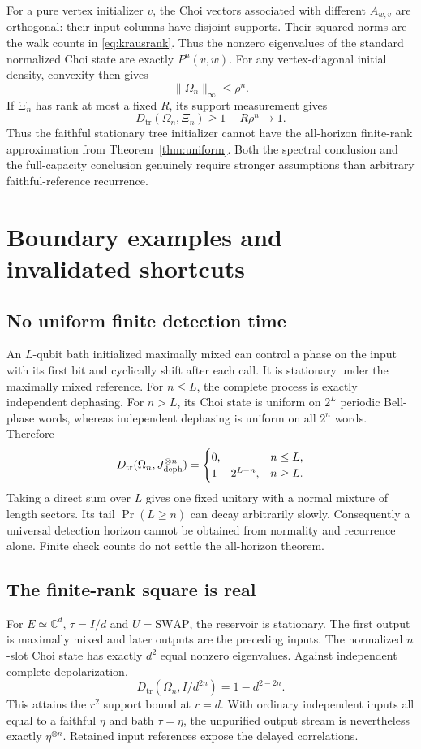 \documentclass[11pt]{article}
\theoremstyle{definition}\newtheorem{definition}[theorem]{Definition}
\newcommand{\norm}[1]{\lVert #1\rVert}
\newcommand{\D}{D_{\mathrm{tr}}}
\begin{document}
For a pure vertex initializer $v$, the Choi vectors associated with different $A_{w,v}$ are orthogonal: their input columns have disjoint supports. Their squared norms are the walk counts in \eqref{eq:krausrank}. Thus the nonzero eigenvalues of the standard normalized Choi state are exactly $P^n(v,w)$. For any vertex-diagonal initial density, convexity then gives
\[
 \norm{\Omega_n}_\infty\le\rho^n.
\]
If $\Xi_n$ has rank at most a fixed $R$, its support measurement gives
\[
 \D(\Omega_n,\Xi_n)\ge1-R\rho^n\longrightarrow1.
\]
Thus the faithful stationary tree initializer cannot have the all-horizon finite-rank approximation from Theorem~\ref{thm:uniform}. Both the spectral conclusion and the full-capacity conclusion genuinely require stronger assumptions than arbitrary faithful-reference recurrence.

\section{Boundary examples and invalidated shortcuts}

\subsection{No uniform finite detection time}
An $L$-qubit bath initialized maximally mixed can control a phase on the input with its first bit and cyclically shift after each call. It is stationary under the maximally mixed reference. For $n\le L$, the complete process is exactly independent dephasing. For $n>L$, its Choi state is uniform on $2^L$ periodic Bell-phase words, whereas independent dephasing is uniform on all $2^n$ words. Therefore
\[
 \D(\Omega_n,J_{\rm deph}^{\otimes n})=
 \begin{cases}0,&n\le L,\\1-2^{L-n},&n\ge L.\end{cases}
\]
Taking a direct sum over $L$ gives one fixed unitary with a normal mixture of length sectors. Its tail $\Pr(L\ge n)$ can decay arbitrarily slowly. Consequently a universal detection horizon cannot be obtained from normality and recurrence alone. Finite check counts do not settle the all-horizon theorem.

\subsection{The finite-rank square is real}
For $E\simeq\mathbb C^d$, $\tau=I/d$ and $U=\mathrm{SWAP}$, the reservoir is stationary. The first output is maximally mixed and later outputs are the preceding inputs. The normalized $n$-slot Choi state has exactly $d^2$ equal nonzero eigenvalues. Against independent complete depolarization,
\[
 \D(\Omega_n,I/d^{2n})=1-d^{2-2n}.
\]
This attains the $r^2$ support bound at $r=d$. With ordinary independent inputs all equal to a faithful $\eta$ and bath $\tau=\eta$, the unpurified output stream is nevertheless exactly $\eta^{\otimes n}$. Retained input references expose the delayed correlations.
\end{document}

